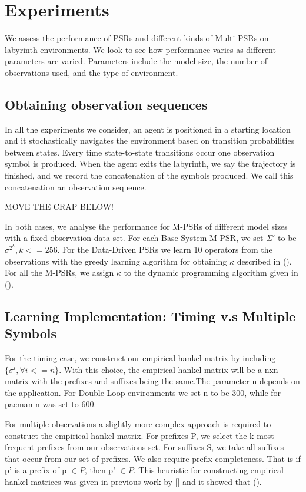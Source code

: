\section{Experiments}
We assess the performance of PSRs and different kinds of Multi-PSRs on labyrinth environments. We look to see how performance varies as different parameters are varied. Parameters include the model size, the number of observations used, and the type of environment. 

\subsection{Obtaining observation sequences}
In all the experiments we consider, an agent is positioned in a starting location and it stochastically navigates the environment based on transition probabilities between states. Every time state-to-state transitions occur one observation symbol is produced. When the agent exits the labyrinth, we say the trajectory is finished, and we record the concatenation of the symbols produced. We call this concatenation an observation sequence.

MOVE THE CRAP BELOW!

In both cases, we analyse the performance for M-PSRs of different model sizes with a fixed observation data set. For each Base System M-PSR, we set $\Sigma'$ to be {$\sigma^{2^k}, k<=256 $}. For the Data-Driven PSRs we learn 10 operators from the observations with the greedy learning algorithm for obtaining $\kappa$ described in (). For all the M-PSRs, we assign $\kappa$ to the dynamic programming algorithm given in (). 

\subsection{Learning Implementation: Timing v.s Multiple Symbols}

For the timing case, we construct our empirical hankel matrix by including $\{\sigma^i, \forall i<=n\}$. With this choice, the empirical hankel matrix will be a nxn matrix with the prefixes and suffixes being the same.The parameter n depends on the application. For Double Loop environments we set n to be 300, while for pacman n was set to 600. 

For multiple observations a slightly more complex approach is required to construct the empirical hankel matrix. For prefixes P, we select the k most frequent prefixes from our observations set. For suffixes S, we take all suffixes that occur from our set of prefixes. We also require prefix completeness. That is if p' is a prefix of p $\in P$, then p' $\in P$. This heuristic for constructing empirical hankel matrices was given in previous work by [] and it showed that ().


